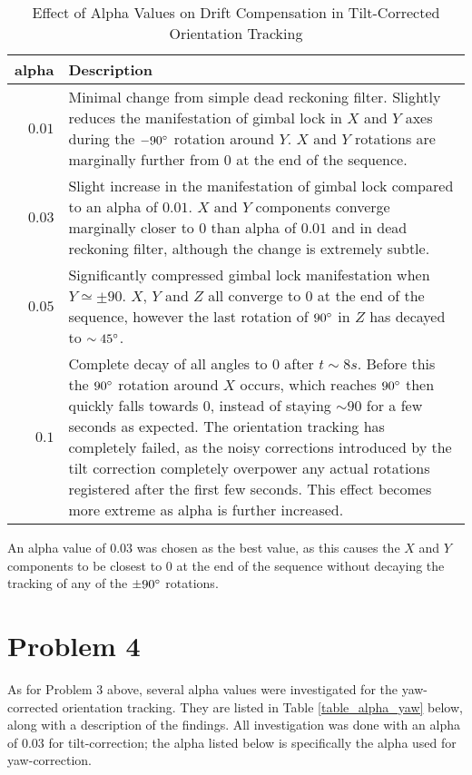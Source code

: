 \documentclass[12pt,a4paper]{article}
\begin{document}
	\begin{table}[h!]
		\caption{Effect of Alpha Values on Drift Compensation in Tilt-Corrected Orientation Tracking}
		\label{table_alpha_tilt}
		\begin{tabu} to 1.0\linewidth {|r|X[l]|}
			\hline
			alpha&Description\\
			\hline
			$0.01$&Minimal change from simple dead reckoning filter. Slightly reduces the manifestation of gimbal lock in $X$ and $Y$ axes during the $-90\degree$ rotation around $Y$. $X$ and $Y$ rotations are marginally further from $0$ at the end of the sequence.\\
			\hline
			$0.03$&Slight increase in the manifestation of gimbal lock compared to an alpha of $0.01$. $X$ and $Y$ components converge marginally closer to $0$ than alpha of $0.01$ and in dead reckoning filter, although the change is extremely subtle.\\
			\hline
			$0.05$&Significantly compressed gimbal lock manifestation when $Y \simeq \pm90$. $X$, $Y$ and $Z$ all converge to $0$ at the end of the sequence, however the last rotation of $90\degree$ in $Z$ has decayed to $\sim45\degree$.\\
			\hline
			$0.1$&Complete decay of all angles to $0$ after $t\sim8s$. Before this the $90\degree$ rotation around $X$ occurs, which reaches $90\degree$ then quickly falls towards $0$, instead of staying $\sim90$ for a few seconds as expected. The orientation tracking has completely failed, as the noisy corrections introduced by the tilt correction completely overpower any actual rotations registered after the first few seconds. This effect becomes more extreme as alpha is further increased.\\
			\hline
		\end{tabu}
	\end{table}
	
	\noindent An alpha value of $0.03$ was chosen as the best value, as this causes the $X$ and $Y$ components to be closest to $0$ at the end of the sequence without decaying the tracking of any of the $\pm90\degree$ rotations.

	\section*{Problem 4}
	
	As for Problem 3 above, several alpha values were investigated for the yaw-corrected orientation tracking. They are listed in Table \ref{table_alpha_yaw} below, along with a description of the findings. All investigation was done with an alpha of $0.03$ for tilt-correction; the alpha listed below is specifically the alpha used for yaw-correction.
	
\end{document}
